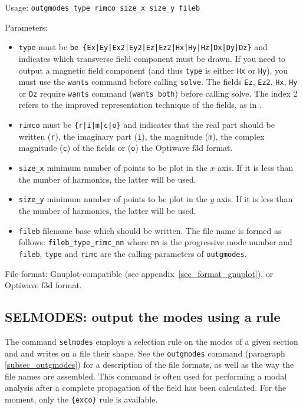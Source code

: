     Usage: \lstinline!outgmodes type rimco size_x size_y fileb!
    
    Parameters:
    \begin{itemize}
    \item
    \lstinline!type!    must be \lstinline!be {Ex|Ey|Ex2|Ey2|Ez|Ez2|Hx|Hy|Hz|Dx|Dy|Dz}! and indicates which transverse field component must be drawn. If you need to output a magnetic field component (and thus \lstinline!type! is either \lstinline!Hx! or \lstinline!Hy!), you must use the \lstinline!wants! command before calling \lstinline!solve!. The fields \lstinline!Ez!, \lstinline!Ez2!, \lstinline!Hx!, \lstinline!Hy! or \lstinline!Dz! require \lstinline!wants!  command (\lstinline!wants both!) before calling  solve.  The index 2 refers to the improved representation technique of the fields, as in \cite{lalanne1998computation}.
     
    \item
    \lstinline!rimco!    must be \lstinline!{r|i|m|c|o}! and indicates that the real part should be written
            (\lstinline!r!), the imaginary part (\lstinline!i!), the magnitude 
            (\lstinline!m!), the complex magnitude (\lstinline!c!) of the 
            fields or (\lstinline!o!) the Optiwave f3d format.
    
    \item
    \lstinline!size_x!  minimum number of points to be plot in the $x$ axis. If it is less than the number of harmonics, the latter will be used.
    \item
    \lstinline!size_y!  minimum number of points to be plot in the $y$ axis. If it is less than the number of harmonics, the latter will be used.
    \item
    \lstinline!fileb!   filename base which should be written. The file name 
        is formed as follows: \lstinline!fileb_type_rimc_nn!
        where \lstinline!nn! is the progressive mode number and \lstinline!fileb!, \lstinline!type! and \lstinline!rimc!
        are the calling parameters of \lstinline!outgmodes!.
    \end{itemize}
    File format: Gnuplot-compatible (see appendix~\ref{sec_format_gnuplot}), or Optiwave f3d format.

\subsection{SELMODES: output the modes using a rule}
The command \lstinline!selmodes! employs a selection rule on the modes of a given section and and writes on a file their shape. See the \lstinline!outgmodes! command (paragraph \ref{subsec_outgmodes}) for a description of the file formats, as well as the way the file names are assembled. This command is often used for performing a modal analysis after a complete propagation of the field has been calculated. For the moment, only the \lstinline!{exco}! rule is available.
        
